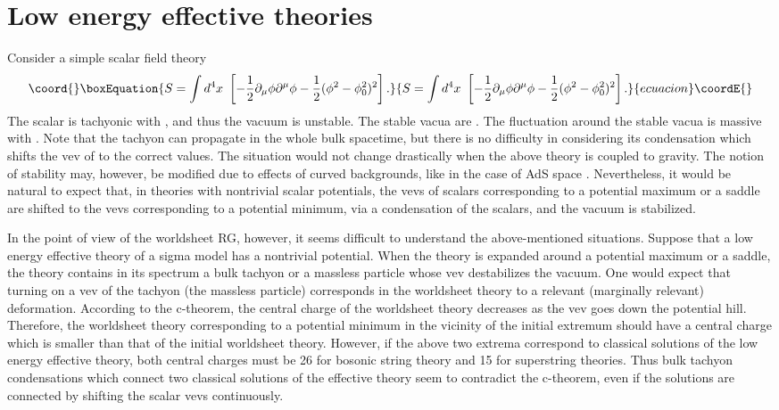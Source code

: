 \documentclass[a4paper,a4paper]{article}
\begin{document}
\vspace{1cm}

\section{Low energy effective theories}    \label{LEET}

\vspace{5mm}

Consider a simple scalar field theory
\begin{equation}\coord{}\boxEquation{
S = \int d^4x\ \left[ -\frac12\partial_\mu\phi\partial^\mu\phi-\frac12(\phi^2-\phi_0^2)^2 \right].
}{
S = \int d^4x\ \left[ -\frac12\partial_\mu\phi\partial^\mu\phi-\frac12(\phi^2-\phi_0^2)^2 \right].
}{ecuacion}\coordE{}\end{equation}
The scalar \myHighlight{$\phi$}\coordHE{} is tachyonic with \coordHE{}, and thus the vacuum \coordHE{} is unstable. 
The stable vacua are \coordHE{}. 
The fluctuation \myHighlight{$\varphi$}\coordHE{} around the stable vacua is massive with \coordHE{}. 
Note that the tachyon \myHighlight{$\phi$}\coordHE{} can propagate in the whole bulk spacetime, but there is no difficulty in considering 
its condensation which shifts the vev of \myHighlight{$\phi$}\coordHE{} to the correct values. 
The situation would not change drastically when the above theory is coupled to gravity. 
The notion of stability may, however, be modified 
due to effects of curved backgrounds, like in the case of AdS space 
\cite{AdS}. 
Nevertheless, it would be natural to expect that, in theories with nontrivial scalar potentials, the vevs of 
scalars corresponding to a potential maximum or a saddle are shifted to the vevs corresponding to a potential 
minimum, via a condensation of the scalars, and the vacuum is stabilized. 

In the point of view of the worldsheet RG, however, 
it seems difficult to understand the above-mentioned situations. 
Suppose that a low energy effective theory of a sigma model has a nontrivial potential. 
When the theory is expanded around a potential maximum or a saddle, the theory contains in its spectrum a bulk 
tachyon or a massless particle whose vev destabilizes the vacuum. 
One would expect that turning on a vev of the tachyon (the massless particle) corresponds in the worldsheet 
theory to a relevant (marginally relevant) deformation. 
According to the c-theorem, the central charge of the worldsheet theory decreases as the vev goes down the 
potential hill. 
Therefore, the worldsheet theory corresponding to a potential minimum in the vicinity of the initial extremum 
should have a central charge which is 
smaller than that of the initial worldsheet theory. 
However, if the above two extrema correspond to classical solutions of the low energy effective theory, 
both central charges must be 26 for bosonic string theory and 15 for superstring theories. 
Thus bulk tachyon condensations which connect two classical solutions of the effective theory seem to contradict 
the c-theorem, even if the solutions are connected by shifting the scalar vevs continuously. 
\end{document}
